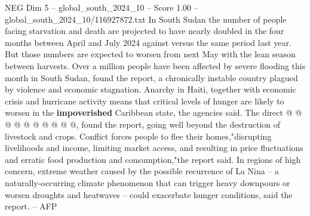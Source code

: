 \begin{textsample}{NEG Dim 5 – global\_south\_2024\_10 – Score 1.00 – global\_south\_2024\_10/116927872.txt}
In South Sudan the number of people facing starvation and death are projected to have nearly doubled in the four months between April and July 2024 against versus the same period last year.
But those numbers are expected to worsen from next May with the lean season between harvests.
Over a million people have been affected by severe flooding this month in South Sudan, found the report, a chronically instable country plagued by violence and economic stagnation.
Anarchy in Haiti, together with economic crisis and hurricane activity means that critical levels of hunger are likely to worsen in the \textbf{impoverished} Caribbean state, the agencies said.
The direct @ @ @ @ @ @ @ @ @ @, found the report, going well beyond the destruction of livestock and crops.
Conflict forces people to flee their homes,"disrupting livelihoods and income, limiting market access, and resulting in price fluctuations and erratic food production and consumption,"the report said.
In regions of high concern, extreme weather caused by the possible recurrence of La Nina -- a naturally-occurring climate phenomenon that can trigger heavy downpours or worsen droughts and heatwaves -- could exacerbate hunger conditions, said the report. -- AFP

\end{textsample}
